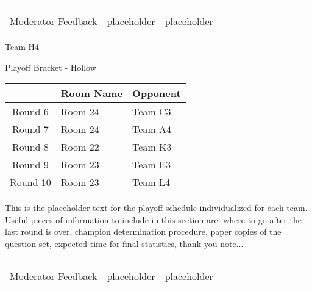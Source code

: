 \documentclass{article}%
\begin{document}
\newline%
%
\begin{tabularx}{\textwidth}{YYY}%
  &  &  \\%
\\%
Moderator Feedback&placeholder&placeholder\\%
\end{tabularx}%
\newpage%
\begin{center}%
\begin{Huge}%
Team H4%
\end{Huge}%
\vspace*{12pt}%
\linebreak%
\begin{Large}%
Playoff Bracket {-} Hollow%
\end{Large}%
\end{center}%
\vspace*{4pt}%
%
\begin{tabularx}{\textwidth}{|c|Y|Y|}%
\hline%
&Room Name&Opponent\\%
\hline%
Round 6&Room 24&Team C3\\%
Round 7&Room 24&Team A4\\%
Round 8&Room 22&Team K3\\%
Round 9&Room 23&Team E3\\%
Round 10&Room 23&Team L4\\%
\hline%
\end{tabularx}%
\vspace*{30pt}%
\linebreak%
This is the placeholder text for the playoff schedule individualized for each team. Useful pieces of information to include in this section are: where to go after the last round is over, champion determination procedure, paper copies of the question set, expected time for final statistics, thank{-}you note...%
\vspace*{30pt}%
\newline%
%
\begin{tabularx}{\textwidth}{YYY}%
  &  &  \\%
\\%
Moderator Feedback&placeholder&placeholder\\%
\end{tabularx}%
\end{document}
